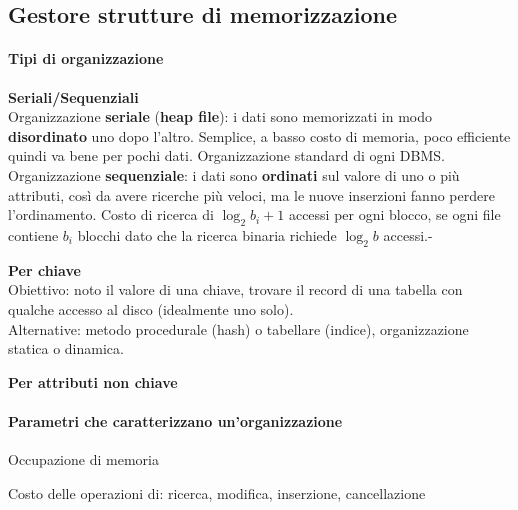 \documentclass[10pt]{book}
\begin{document}
\subsection{Gestore strutture di memorizzazione}
\paragraph{Tipi di organizzazione}\begin{list}{}{}
	\item \textbf{Seriali/Sequenziali}\\
	Organizzazione \textbf{seriale} (\textbf{heap file}): i dati sono memorizzati in modo \textbf{disordinato} uno dopo l'altro. Semplice, a basso costo di memoria, poco efficiente quindi va bene per pochi dati. Organizzazione standard di ogni DBMS.\\
	Organizzazione \textbf{sequenziale}: i dati sono \textbf{ordinati} sul valore di uno o più attributi, così da avere ricerche più veloci, ma le nuove inserzioni fanno perdere l'ordinamento. Costo di ricerca di $\log_2 b_i + 1$ accessi per ogni blocco, se ogni file contiene $b_i$ blocchi dato che la ricerca binaria richiede $\log_2 b$ accessi.-
	\item \textbf{Per chiave}\\
	Obiettivo: noto il valore di una chiave, trovare il record di una tabella con qualche accesso al disco (idealmente uno solo).\\
	Alternative: metodo procedurale (hash) o tabellare (indice), organizzazione statica o dinamica.
	\item \textbf{Per attributi non chiave}
\end{list}
\paragraph{Parametri che caratterizzano un'organizzazione}\begin{list}{}{}
	\item Occupazione di memoria
	\item Costo delle operazioni di: ricerca, modifica, inserzione, cancellazione
\end{list}
\end{document}
